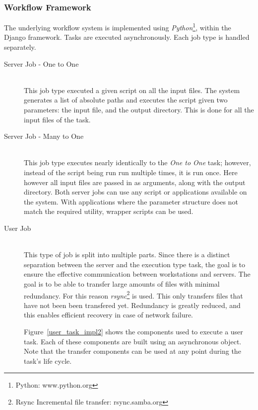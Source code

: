 \documentclass[12pt,a4paper]{report}
\begin{document}
\subsubsection{Workflow Framework}
The underlying workflow system is implemented using \emph{Python}\footnote{Python: www.python.org}, within
the Django framework. Tasks are executed asynchronously. Each job type is handled separately.
\begin{description}
\item[Server Job - One to One] \hfill \\
    This job type executed a given script on all the input files. The system generates a list of
    absolute paths and executes the script given two parameters: the input file, and the output
    directory. This is done for all the input files of the task.
\item[Server Job - Many to One] \hfill \\
    This job type executes nearly identically to the \emph{One to One} task;
    however, instead
    of the script being run run multiple times, it is run once. Here however all input files
    are passed in as arguments, along with the output directory. Both server jobs can use
    any script or applications available on the system. With applications where the parameter
    structure does not match the required utility, wrapper scripts can be used.
\item[User Job] \hfill \\
    This type of job is split into multiple parts. Since there is a distinct separation between
    the server and the execution type task, the goal is to ensure the effective communication
    between workstations and servers. The goal is to be able to transfer large amounts of files
    with minimal redundancy. For this reason \emph{rsync}\footnote{Rsync Incremental file
    transfer: rsync.samba.org} is used. This only transfers files that have not been been transfered
    yet. Redundancy is greatly reduced, and this enables efficient recovery in case of network failure.

    Figure~\ref{user_task_impl2} shows the components used to execute a user task. Each of these components
    are built using an asynchronous object. Note that the transfer components can be used at any point
    during the task's life cycle.
\end{description}
\end{document}
